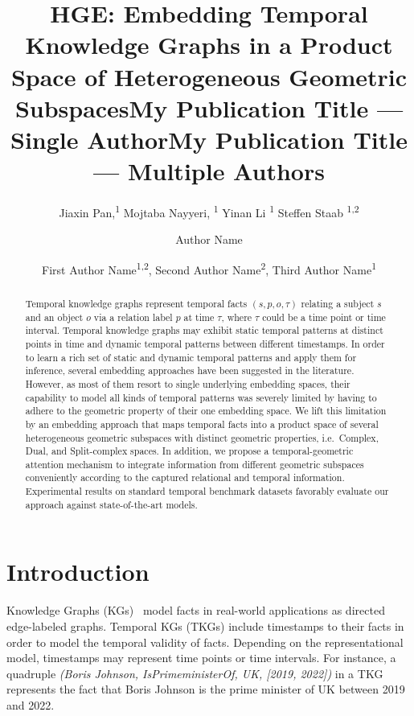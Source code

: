 \documentclass[letterpaper]{article} %
\title{HGE: Embedding Temporal Knowledge Graphs in a Product Space of Heterogeneous Geometric Subspaces}
\author {
    Jiaxin Pan,\textsuperscript{\rm 1}
    Mojtaba Nayyeri, \textsuperscript{\rm 1}
    Yinan Li \textsuperscript{\rm 1}
    Steffen Staab \textsuperscript{\rm 1,2}
}
\title{My Publication Title --- Single Author}
\author {
    Author Name
}
\title{My Publication Title --- Multiple Authors}
\author {
    First Author Name\textsuperscript{\rm 1,\rm 2},
    Second Author Name\textsuperscript{\rm 2},
    Third Author Name\textsuperscript{\rm 1}
}
\begin{document}
\maketitle

\begin{abstract}
Temporal knowledge graphs represent temporal facts $(s,p,o,\tau)$ relating a subject $s$ and an object $o$ via a relation label $p$ at time $\tau$, where $\tau$ could be a time point or time interval. Temporal knowledge graphs may exhibit static temporal patterns at distinct points in time and dynamic temporal patterns between different timestamps.
In order to learn a rich set of static and dynamic temporal patterns and apply them for inference, several embedding approaches have been suggested in the literature.
However, as most of them resort to single underlying embedding spaces, their capability to model all kinds of temporal patterns was severely limited by having to adhere to the geometric property of their one embedding space.
We lift this limitation by an embedding approach that maps temporal facts into a product space of several heterogeneous geometric subspaces with distinct geometric properties, i.e.\  Complex,  Dual, and  Split-complex spaces. In addition, we propose a temporal-geometric attention mechanism to integrate information from different geometric subspaces conveniently according to the captured relational and temporal information.
Experimental results on standard temporal benchmark datasets favorably evaluate our approach against state-of-the-art models.
\end{abstract}

\section{Introduction}
Knowledge Graphs (KGs)~\cite{hogan2021knowledge} model facts in real-world applications as directed edge-labeled graphs. Temporal KGs (TKGs) include timestamps to their facts in order to model the temporal validity of facts. Depending on the representational model, timestamps may represent time points or time intervals. For instance, a quadruple \textit{(Boris Johnson, IsPrimeministerOf, UK, [2019, 2022])} in a TKG represents the fact that Boris Johnson is the prime minister of UK between 2019 and 2022.
\end{document}
